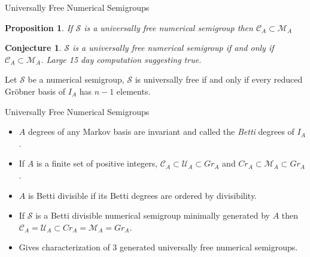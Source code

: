\documentclass[9pt]{beamer}
\newtheorem*{prop}{Proposition}
\newtheorem*{conj}{Conjecture}
\theoremstyle{definition}
\begin{document}



\begin{frame}[fragile]{Universally Free Numerical Semigroups}
  \begin{prop}
    If $\mathcal{S}$ is a universally free numerical semigroup then $\mathcal{C}_A \subset \mathcal{M}_A$
  \end{prop}

  \begin{conj}
     $\mathcal{S}$ is a universally free numerical semigroup if and only if $\mathcal{C}_A \subset \mathcal{M}_A$. Large 15 day computation suggesting true.
   \end{conj}

   \begin{theorem}
     Let $\mathcal{S}$ be a numerical semigroup, $\mathcal{S}$ is universally free if and only if every reduced Gr\"obner basis of $I_A$ has $n-1$ elements.
   \end{theorem}
 \end{frame}


 \begin{frame}[fragile]{Universally Free Numerical Semigroups}
   \begin{itemize}
   \item $A$ degrees of any Markov basis are invariant and called the \emph{Betti} degrees of $I_A$.
   \item If $A$ is a finite set of positive integers, $\mathcal{C}_A \subset \mathcal{U}_A \subset Gr_A$ and $Cr_A \subset \mathcal{M}_A \subset Gr_A$.
   \item $A$ is Betti divisible if its Betti degrees are ordered by divisibility.
   \item If $\mathcal{S}$ is a Betti divisible numerical semigroup minimally generated by $A$ then $\mathcal{C}_A = \mathcal{U}_A \subset Cr_A = \mathcal{M}_A = Gr_A$.
   \item Gives characterization of 3 generated universally free numerical semigroups.
   \end{itemize}


 \end{frame}
\end{document}
